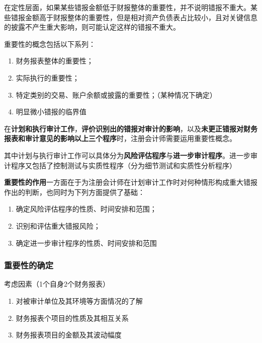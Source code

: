 \documentclass[UTF8,12pt]{ctexart}
\numberwithin{equation}{section} %
\numberwithin{figure}{section}
\numberwithin{table}{section}
\begin{document}
	在定性层面，如果某些错报金额低于财报整体的重要性，并不说明错报不重大。某些错报金额高于财报整体的重要性，但是相对资产负债表占比较小，且对关键信息的披露不产生重大影响，则可能认定这样的错报不重大。
	
	
	重要性的概念包括以下系列：
	\begin{enumerate}
		\item 财务报表整体的重要性；
		
		\item 实际执行的重要性；
		
		\item 特定类别的交易、账户余额或披露的重要性；（某种情况下确定）
		
		\item 明显微小错报的临界值
	\end{enumerate}

	
	在\textbf{计划和执行审计工作}，\textbf{评价识别出的错报对审计的影响}，以及\textbf{未更正错报对财务报表和审计意见的影响}\textbf{以上三个程序}时，注册会计师需要运用重要性概念。
	
	其中计划与执行审计工作可以具体分为\textbf{风险评估程序}与\textbf{进一步审计程序}。进一步审计程序又包括了控制测试与实质性程序（分为细节测试和实质性分析程序）
	
	\textbf{重要性的作用}一方面在于为注册会计师在计划审计工作时对何种情形构成重大错报作出的判断，也同时为下列方面提供了基础：
	\begin{enumerate}
		\item 确定风险评估程序的性质、时间安排和范围；
	
		\item 识别和评估重大错报风险；
	
		\item 确定进一步审计程序的性质、时间安排和范围
	\end{enumerate}
	
	\subsubsection{重要性的确定}
	考虑因素（1个自身2个财务报表）
	\begin{enumerate}
		\item 对被审计单位及其环境等方面情况的了解
		
		\item 财务报表个项目的性质及其相互关系
		
		\item 财务报表项目的金额及其波动幅度
	\end{enumerate}
	
\end{document}
